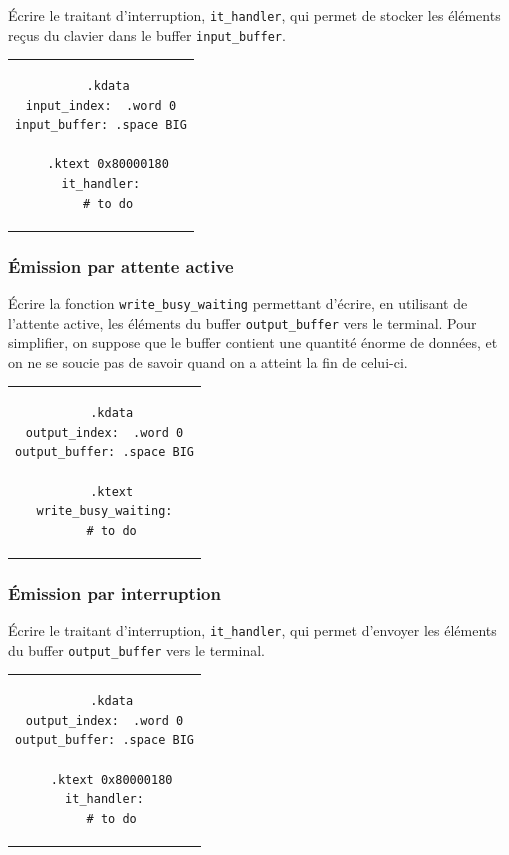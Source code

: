 \documentclass[12pt]{article}
\begin{document}
\'Ecrire le traitant d'interruption, \verb+it_handler+, qui permet de stocker les éléments reçus du clavier dans le buffer \verb+input_buffer+.\\

\begin{tabular}{c}
\begin{lstlisting}
  .kdata
input_index:  .word 0
input_buffer: .space BIG

  .ktext 0x80000180
it_handler:
  # to do
\end{lstlisting}
\end{tabular}

\subsubsection{\'Emission par attente active}

\'Ecrire la fonction \verb+write_busy_waiting+ permettant d'écrire, en utilisant de l'attente active, les éléments du buffer
\verb+output_buffer+ vers le terminal. Pour simplifier, on suppose que le buffer contient une quantité énorme de données, et on ne se
soucie pas de savoir quand on a atteint la fin de celui-ci.\\

\lstset{language=[mips]Assembler}

\begin{tabular}{c}
\begin{lstlisting}
  .kdata
output_index:  .word 0
output_buffer: .space BIG

  .ktext
write_busy_waiting:
  # to do
\end{lstlisting}
\end{tabular}

\subsubsection{\'Emission par interruption}

\'Ecrire le traitant d'interruption, \verb+it_handler+, qui permet d'envoyer les éléments du buffer \verb+output_buffer+ vers le terminal.\\

\lstset{language=[mips]Assembler}

\begin{tabular}{c}
\begin{lstlisting}
  .kdata
output_index:  .word 0
output_buffer: .space BIG

  .ktext 0x80000180
it_handler:
  # to do
\end{lstlisting}
\end{tabular}
\end{document}
